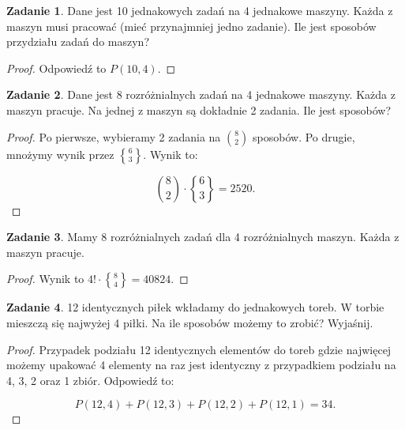 \documentclass[11pt]{article}
\theoremstyle{definition}
\newtheorem{zadanie}{Zadanie}
\numberwithin{zadanie}{subsection}
\DeclareRobustCommand{\stirling}{\genfrac\{\}{0pt}{}}
\begin{document}
\begin{zadanie}
    Dane jest 10 jednakowych zadań na 4 jednakowe maszyny. Każda z maszyn musi pracować (mieć przynajmniej jedno zadanie). Ile jest sposobów przydziału zadań do maszyn?
\end{zadanie}
\begin{proof}
    Odpowiedź to $P(10,4)$.
\end{proof}

\begin{zadanie}
    Dane jest 8 rozróżnialnych zadań na 4 jednakowe maszyny. Każda z maszyn pracuje. Na jednej z maszyn są dokładnie 2 zadania. Ile jest sposobów?
\end{zadanie}
\begin{proof}
    Po pierwsze, wybieramy 2 zadania na $\binom 82$ sposobów. Po drugie, mnożymy wynik przez $\stirling63$. Wynik to:

    $$\binom82\cdot \stirling63 = 2520.$$
\end{proof}
\begin{zadanie}
    Mamy 8 rozróżnialnych zadań dla 4 rozróżnialnych maszyn. Każda z maszyn pracuje.
\end{zadanie}
\begin{proof}
    Wynik to $4!\cdot\stirling 84 = 40824$.
\end{proof}
\begin{zadanie}
    12 identycznych piłek wkładamy do jednakowych toreb. W torbie mieszczą się najwyżej 4 piłki. Na ile sposobów możemy to zrobić? Wyjaśnij.
\end{zadanie}
\begin{proof}
    Przypadek podziału 12 identycznych elementów do toreb gdzie najwięcej możemy upakować 4 elementy na raz jest identyczny z przypadkiem podziału na 4, 3, 2 oraz 1 zbiór. Odpowiedź to:

    $$P(12,4)+P(12,3)+P(12,2)+P(12,1)=34.$$
\end{proof}
\end{document}
